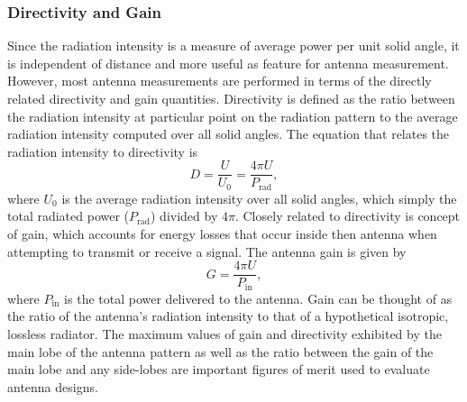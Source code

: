 \subsubsection{Directivity and Gain}
Since the radiation intensity is a measure of average power per unit solid angle, it is independent of distance and more useful as feature for antenna measurement. However, most antenna measurements are performed in terms of the directly related directivity and gain quantities. Directivity is defined as the ratio between the radiation intensity at particular point on the radiation pattern to the average radiation intensity computed over all solid angles.
The equation that relates the radiation intensity to directivity is
\begin{equation}
    D = \frac{U}{U_0}=\frac{4\pi U}{P_\textrm{rad}},
\end{equation}
where $U_0$ is the average radiation intensity over all solid angles, which simply the total radiated power ($P_\textrm{rad}$) divided by $4\pi$. Closely related to directivity is concept of gain, which accounts for energy losses that occur inside then antenna when attempting to transmit or receive a signal. The antenna gain is given by 
\begin{equation}
    G=\frac{4\pi U}{P_\mathrm{in}},
\end{equation}
where $P_\mathrm{in}$ is the total power delivered to the antenna. Gain can be thought of as the ratio of the antenna's radiation intensity to that of a hypothetical isotropic, lossless radiator. The maximum values of gain and directivity exhibited by the main lobe of the antenna pattern as well as the ratio between the gain of the main lobe and any side-lobes are important figures of merit used to evaluate antenna designs. 

